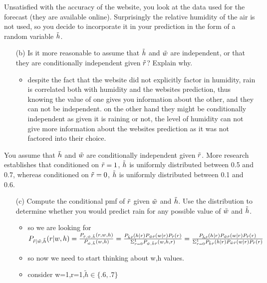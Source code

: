 \documentclass[12pt,twoside]{article}
\begin{document}
\begin{enumerate}
\begin{enumerate}
\end{enumerate}
Unsatisfied with the accuracy of the website, you look at the data used for the forecast (they are available online). Surprisingly the relative humidity of the air is not used, so you decide to incorporate it in your prediction in the form of a random variable $\tilde{ h }$. 
\begin{enumerate}
 \item[(b)] Is it more reasonable to assume that $\tilde{ h }$ and $\tilde{ w }$ are independent, or that they are conditionally independent given $\tilde{ r }$? Explain why.
 \begin{itemize}
     \item despite the fact that the website did not explicitly factor in humidity, rain is correlated both with humidity and the websites prediction, thus knowing the value of one gives you information about the other, and they can not be independent. 
     \itme on the other hand they might be conditionally independent as given it is raining or not, the level of humidity can not give more information about the websites prediction as it was not factored into their choice. 
 \end{itemize}
\end{enumerate}
You assume that $\tilde{ h }$ and $\tilde{ w }$ are conditionally independent given $\tilde{ r }$. More research establishes that conditioned on $\tilde{ r }=1$, $\tilde{ h }$ is uniformly distributed between 0.5 and 0.7, whereas conditioned on $\tilde{ r }=0$, $\tilde{ h }$ is uniformly distributed between 0.1 and 0.6.  \begin{enumerate}
 \item[(c)] Compute the conditional pmf of $\tilde{ r }$ given $\tilde{ w }$ and $\tilde{ h }$. Use the distribution to determine whether you would predict rain for any possible value of $\tilde{ w }$ and $\tilde{ h }$.
 \begin{itemize}
     \item so we are looking for $P_{\tilde{r}|\tilde{w},\tilde{h}}(r|w,h)=\frac{P_{\tilde{r},\tilde{w},\tilde{h}}(r,w,h)}{P_{\tilde{w},\tilde{h}}(w,h)}=\frac{P_{\tilde{h}\tilde{r}}(h|r)P_{\tilde{w}\tilde{r}}(w|r)P_{\tilde{r}}(r)}{\Sigma_{r=0}^{1}P_{\tilde{w},\tilde{h}\tilde{r}}(w,h,r)}=\\\frac{P_{\tilde{h}\tilde{r}}(h|r)P_{\tilde{w}\tilde{r}}(w|r)P_{\tilde{r}}(r)}{\Sigma_{r=0}^{1}P_{\tilde{h}\tilde{r}}(h|r)P_{\tilde{w}\tilde{r}}(w|r)P_{\tilde{r}}(r)}$
     \item so now we need to start thinking about w,h values. 
     \item consider w=1,r=1,$\tilde{h}\in\{.6,.7\}$

\end{itemize}
\end{enumerate}
\end{enumerate}
\end{document}

